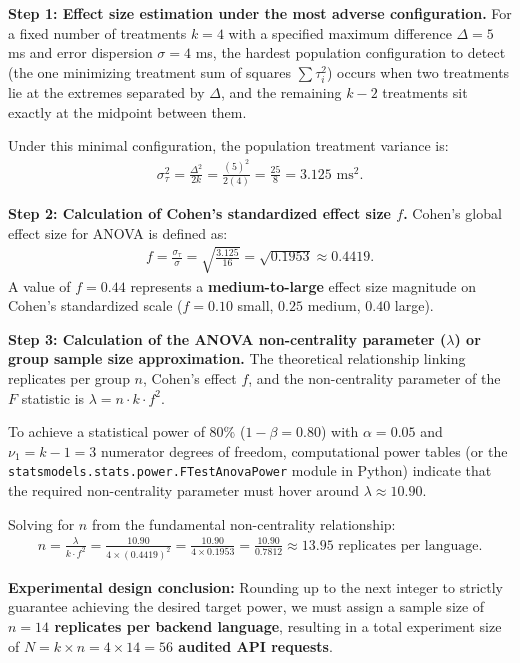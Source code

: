 \begin{solproblema}
	\textbf{Step 1: Effect size estimation under the most adverse configuration.}
	For a fixed number of treatments $k = 4$ with a specified maximum difference $\Delta = 5$ ms and error dispersion $\sigma = 4$ ms, the hardest population configuration to detect (the one minimizing treatment sum of squares $\sum \tau_i^2$) occurs when two treatments lie at the extremes separated by $\Delta$, and the remaining $k-2$ treatments sit exactly at the midpoint between them.
	
	Under this minimal configuration, the population treatment variance is:
	\begin{align}
		\sigma_{\tau}^2 = \frac{\Delta^2}{2k} = \frac{(5)^2}{2(4)} = \frac{25}{8} = 3.125 \text{ ms}^2.
	\end{align}
	
	\textbf{Step 2: Calculation of Cohen's standardized effect size $f$.}
	Cohen's global effect size for ANOVA is defined as:
	\begin{align}
		f = \frac{\sigma_{\tau}}{\sigma} = \sqrt{\frac{3.125}{16}} = \sqrt{0.1953} \approx 0.4419.
	\end{align}
	A value of $f = 0.44$ represents a \textbf{medium-to-large} effect size magnitude on Cohen's standardized scale ($f=0.10$ small, $0.25$ medium, $0.40$ large).
	
	\textbf{Step 3: Calculation of the ANOVA non-centrality parameter ($\lambda$) or group sample size approximation.}
	The theoretical relationship linking replicates per group $n$, Cohen's effect $f$, and the non-centrality parameter of the $F$ statistic is $\lambda = n \cdot k \cdot f^2$.
	
	To achieve a statistical power of $80\%$ ($1 - \beta = 0.80$) with $\alpha = 0.05$ and $\nu_1 = k - 1 = 3$ numerator degrees of freedom, computational power tables (or the \texttt{statsmodels.stats.power.FTestAnovaPower} module in Python) indicate that the required non-centrality parameter must hover around $\lambda \approx 10.90$.
	
	Solving for $n$ from the fundamental non-centrality relationship:
	\begin{align}
		n = \frac{\lambda}{k \cdot f^2} = \frac{10.90}{4 \times (0.4419)^2} = \frac{10.90}{4 \times 0.1953} = \frac{10.90}{0.7812} \approx 13.95 \text{ replicates per language}.
	\end{align}
	
	\textbf{Experimental design conclusion:} Rounding up to the next integer to strictly guarantee achieving the desired target power, we must assign a sample size of \textbf{$n = 14$ replicates per backend language}, resulting in a total experiment size of \textbf{$N = k \times n = 4 \times 14 = 56$ audited API requests}.
\end{solproblema}

